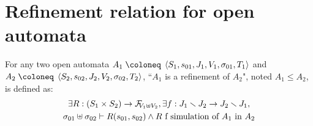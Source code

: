 \documentclass{article}
\begin{document}
\section{Refinement relation for open automata}
\begin{defi}
For any two open automata \(A_1 \defobject \OA{S_1}{s_{01}}{J_1}{V_1}{\sigma_{01}}{T_1}\) and \(A_2 \defobject \OA{S_2}{s_{02}}{J_2}{V_2}{\sigma_{02}}{T_2}\), ``\(A_1\) is a refinement of \(A_2\)", noted \(A_1 \leq A_2\), is defined as:
\begin{multline*}
	\exists R: \mpar{S_1 \times S_2} \to \rformulae[V_1 \uplus V_2], \exists f: J_1 \setminus J_2 \to J_2 \setminus J_1, \\
	\sigma_{01} \uplus \sigma_{02} \vdash R\mpar{s_{01}, s_{02}} \wedge R \text{ f simulation of } A_1 \text{ in } A_2
\end{multline*}
\end{defi}
\end{document}
